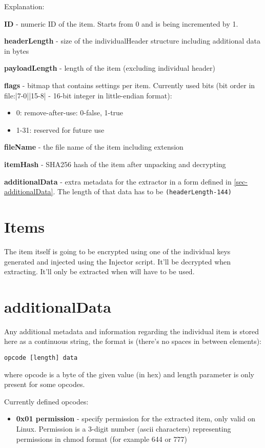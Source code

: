 Explanation:

\textbf{ID} - numeric ID of the item. Starts from 0 and is being incremented by 1.

\textbf{headerLength} - size of the individualHeader structure including additional data in bytes

\textbf{payloadLength} - length of the item (excluding individual header)

\textbf{flags} - bitmap that contains settings per item. Currently used bits (bit order in file:|7-0||15-8| - 16-bit integer in little-endian format):
\begin{itemize}
  \item 0: remove-after-use: 0-false, 1-true
  \item 1-31: reserved for future use
\end{itemize}

\textbf{fileName} - the file name of the item including extension 

\textbf{itemHash} - SHA256 hash of the item after unpacking and decrypting

\textbf{additionalData} - extra metadata for the extractor in a form defined in \autoref{sec-additionalData}. The length of that data has to be \texttt{(headerLength-144)} 

\section{Items}
The item itself is going to be encrypted using one of the individual keys generated and injected using the Injector script. It'll be decrypted when extracting. It'll only be extracted when will have to be used.

\section{additionalData}
\label{sec-additionalData}
Any additional metadata and information regarding the individual item is stored here as a continuous string, the format is (there's no spaces in between elements):

\texttt{opcode [length] data}

where opcode is a byte of the given value (in hex) and length parameter is only present for some opcodes.

Currently defined opcodes:
\begin{itemize}
  \item \textbf{0x01 permission} - specify permission for the extracted item, only valid on Linux. Permission is a 3-digit number (ascii characters) representing permissions in chmod format (for example 644 or 777) 
\end{itemize}